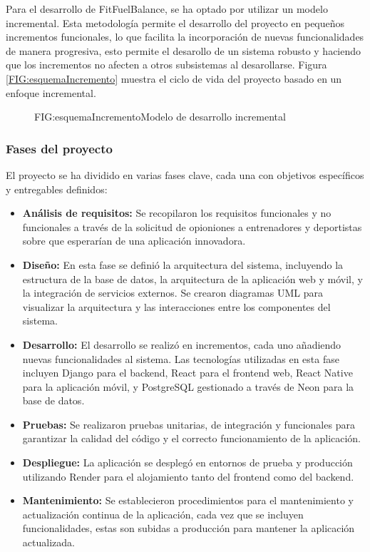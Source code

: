 Para el desarrollo de FitFuelBalance, se ha optado por utilizar un modelo incremental. Esta metodología permite el desarrollo del proyecto en pequeños incrementos funcionales, lo que facilita la incorporación de nuevas funcionalidades de manera progresiva, esto permite el desarollo de un sistema robusto y haciendo que los incrementos no afecten a otros subsistemas al desarollarse. Figura \ref{FIG:esquemaIncremento} muestra el ciclo de vida del proyecto basado en un enfoque incremental.

\begin{figure}[Esquema Modelo Incremental]{FIG:esquemaIncremento}{Modelo de desarrollo incremental \cite{MetodologiaIncremental}}
\end{figure}

\subsubsection{Fases del proyecto}

El proyecto se ha dividido en varias fases clave, cada una con objetivos específicos y entregables definidos:

\begin{itemize}
    \item \textbf{Análisis de requisitos:} Se recopilaron los requisitos funcionales y no funcionales a través de la solicitud de opioniones a entrenadores y deportistas sobre que esperarían de una aplicación innovadora.

    \item \textbf{Diseño:} En esta fase se definió la arquitectura del sistema, incluyendo la estructura de la base de datos, la arquitectura de la aplicación web y móvil, y la integración de servicios externos. Se crearon diagramas UML para visualizar la arquitectura y las interacciones entre los componentes del sistema.

    \item \textbf{Desarrollo:} El desarrollo se realizó en incrementos, cada uno añadiendo nuevas funcionalidades al sistema. Las tecnologías utilizadas en esta fase incluyen Django para el backend, React para el frontend web, React Native para la aplicación móvil, y PostgreSQL gestionado a través de Neon para la base de datos.

    \item \textbf{Pruebas:} Se realizaron pruebas unitarias, de integración y funcionales para garantizar la calidad del código y el correcto funcionamiento de la aplicación.

    \item \textbf{Despliegue:} La aplicación se desplegó en entornos de prueba y producción utilizando Render para el alojamiento tanto del frontend como del backend.

    \item \textbf{Mantenimiento:} Se establecieron procedimientos para el mantenimiento y actualización continua de la aplicación, cada vez que se incluyen funcionalidades, estas son subidas a producción para mantener la aplicación actualizada.

\end{itemize}

